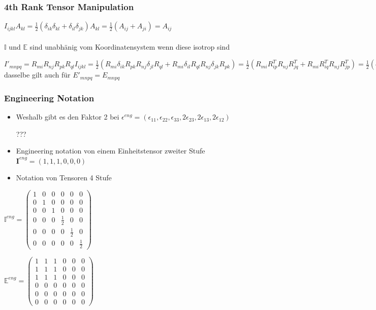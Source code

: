 \documentclass[a4paper]{scrartcl}
\begin{document}
\subsubsection{4th Rank Tensor Manipulation}


$I_{ijkl}A_{kl}=\frac{1}{2}(\delta_{ik}\delta_{kl}+\delta_{il}\delta_{jk})A_{kl}=\frac{1}{2}(A_{ij}+A_{ji})=A_{ij}$
\\
\\
$ \mathbb{I} $ und $ \mathbb{E} $ sind unabhänig vom Koordinatensystem wenn diese isotrop sind

$ I'_{mnpq}=R_{mi}R_{nj}R_{pk}R_{ql}I_{ijkl} = \frac{1}{2}(R_{mi}\delta_{ik}R_{pk}R_{nj}\delta_{jl}R_{ql} + R_{mi}\delta_{il}R_{ql}R_{nj}\delta_{jk}R_{pk})= \frac{1}{2}(R_{mi}R^T_{ip}R_{nj}R^T_{jq}+R_{mi}R^T_{iq}R_{nj}R^T_{jp})= \frac{1}{2}(\delta_{mp}\delta_{mq}\delta_{np})=I_{mnpq} $ dasselbe gilt auch für $ E'_{mnpq}=E_{mnpq}$


\subsubsection{Engineering Notation}
\begin{itemize}
\item Weshalb gibt es den Faktor 2 bei $ \epsilon^{eng}=(\epsilon_{11},\epsilon_{22},\epsilon_{33},2\epsilon_{23},2\epsilon_{13},2\epsilon_{12}) $

???


\item Engineering notation von einem Einheitstensor zweiter Stufe
$ \textbf{I}^{eng}=(1,1,1,0,0,0) $


\item Notation von Tensoren 4 Stufe

\end{itemize}
$ \mathbb{I}^{eng}=
\begin{pmatrix}
1 & 0 & 0 & 0 & 0 & 0 \\ 
0 & 1 & 0 & 0 & 0 & 0 \\ 
0 & 0 & 1 & 0 & 0 & 0 \\ 
0 & 0 & 0 & \frac{1}{2} & 0 & 0 \\ 
0 & 0 & 0 & 0 & \frac{1}{2} & 0 \\ 
0 & 0 & 0 & 0 & 0 & \frac{1}{2}
\end{pmatrix} 
$

$
\mathbb{E}^{eng}=
\begin{pmatrix}
1 & 1 & 1 & 0 & 0 & 0 \\ 
1 & 1 & 1 & 0 & 0 & 0 \\ 
1 & 1 & 1 & 0 & 0 & 0 \\ 
0 & 0 & 0 & 0 & 0 & 0 \\ 
0 & 0 & 0 & 0 & 0 & 0 \\ 
0 & 0 & 0 & 0 & 0 & 0
\end{pmatrix} 
$
\end{document}
